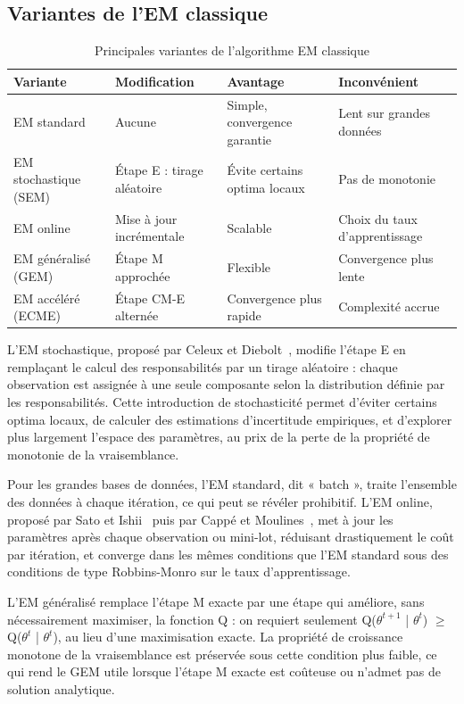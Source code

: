 \subsection{Variantes de l'EM classique}\label{sec:variantes_em}
\begin{table}[H]
\centering
\small
\setlength{\tabcolsep}{0.14cm}
\begin{tabular}{|p{3.54cm}|p{3.54cm}|p{3.54cm}|p{3.54cm}|}
\hline
\textbf{Variante} & \textbf{Modification} & \textbf{Avantage} & \textbf{Inconvénient} \\
\hline
EM standard & Aucune & Simple, convergence garantie & Lent sur grandes données \\
\hline
EM stochastique (SEM) & Étape E : tirage aléatoire & Évite certains optima locaux & Pas de monotonie \\
\hline
EM online & Mise à jour incrémentale & Scalable & Choix du taux d'apprentissage \\
\hline
EM généralisé (GEM) & Étape M approchée & Flexible & Convergence plus lente \\
\hline
EM accéléré (ECME) & Étape CM-E alternée & Convergence plus rapide & Complexité accrue \\
\hline
\end{tabular}
\caption{Principales variantes de l'algorithme EM classique}
\label{tab:1_3}
\end{table}
L'EM stochastique, proposé par Celeux et Diebolt~\cite{celeux1985}, modifie l'étape E en remplaçant le calcul des responsabilités par un tirage aléatoire : chaque observation est assignée à une seule composante selon la distribution définie par les responsabilités. Cette introduction de stochasticité permet d'éviter certains optima locaux, de calculer des estimations d'incertitude empiriques, et d'explorer plus largement l'espace des paramètres, au prix de la perte de la propriété de monotonie de la vraisemblance.

Pour les grandes bases de données, l'EM standard, dit « batch », traite l'ensemble des données à chaque itération, ce qui peut se révéler prohibitif. L'EM online, proposé par Sato et Ishii~\cite{sato2000} puis par Cappé et Moulines~\cite{cappe2009}, met à jour les paramètres après chaque observation ou mini-lot, réduisant drastiquement le coût par itération, et converge dans les mêmes conditions que l'EM standard sous des conditions de type Robbins-Monro sur le taux d'apprentissage.

L'EM généralisé remplace l'étape M exacte par une étape qui améliore, sans nécessairement maximiser, la fonction Q : on requiert seulement Q($\theta ^{t+1}$ | $\theta ^{t}$) $\geq $ Q($\theta ^{t}$ | $\theta ^{t}$), au lieu d'une maximisation exacte. La propriété de croissance monotone de la vraisemblance est préservée sous cette condition plus faible, ce qui rend le GEM utile lorsque l'étape M exacte est coûteuse ou n'admet pas de solution analytique.

